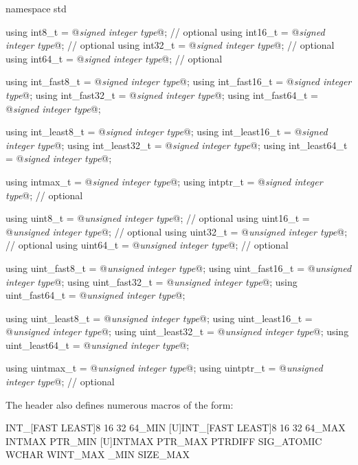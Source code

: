 \begin{codeblock}
namespace std {
  using int8_t         = @\textit{signed integer type}@;  // optional
  using int16_t        = @\textit{signed integer type}@;  // optional
  using int32_t        = @\textit{signed integer type}@;  // optional
  using int64_t        = @\textit{signed integer type}@;  // optional

  using int_fast8_t    = @\textit{signed integer type}@;
  using int_fast16_t   = @\textit{signed integer type}@;
  using int_fast32_t   = @\textit{signed integer type}@;
  using int_fast64_t   = @\textit{signed integer type}@;

  using int_least8_t   = @\textit{signed integer type}@;
  using int_least16_t  = @\textit{signed integer type}@;
  using int_least32_t  = @\textit{signed integer type}@;
  using int_least64_t  = @\textit{signed integer type}@;

  using intmax_t       = @\textit{signed integer type}@;
  using intptr_t       = @\textit{signed integer type}@;   // optional

  using uint8_t        = @\textit{unsigned integer type}@; // optional
  using uint16_t       = @\textit{unsigned integer type}@; // optional
  using uint32_t       = @\textit{unsigned integer type}@; // optional
  using uint64_t       = @\textit{unsigned integer type}@; // optional

  using uint_fast8_t   = @\textit{unsigned integer type}@;
  using uint_fast16_t  = @\textit{unsigned integer type}@;
  using uint_fast32_t  = @\textit{unsigned integer type}@;
  using uint_fast64_t  = @\textit{unsigned integer type}@;

  using uint_least8_t  = @\textit{unsigned integer type}@;
  using uint_least16_t = @\textit{unsigned integer type}@;
  using uint_least32_t = @\textit{unsigned integer type}@;
  using uint_least64_t = @\textit{unsigned integer type}@;

  using uintmax_t      = @\textit{unsigned integer type}@;
  using uintptr_t      = @\textit{unsigned integer type}@; // optional
}
\end{codeblock}

\pnum
The header also defines numerous macros of the form:

\begin{codeblock}
  INT_[FAST LEAST]{8 16 32 64}_MIN
  [U]INT_[FAST LEAST]{8 16 32 64}_MAX
  INT{MAX PTR}_MIN
  [U]INT{MAX PTR}_MAX
  {PTRDIFF SIG_ATOMIC WCHAR WINT}{_MAX _MIN}
  SIZE_MAX
\end{codeblock}

